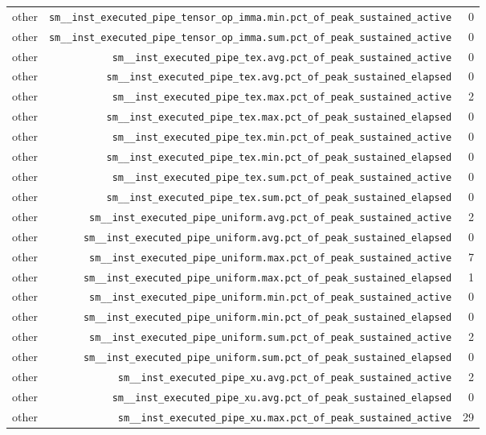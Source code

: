 \begin{table}[h]
\begin{tabular}{|l|r|r|}
other & \texttt{sm__inst_executed_pipe_tensor_op_imma.min.pct_of_peak_sustained_active} & 0 \\
other & \texttt{sm__inst_executed_pipe_tensor_op_imma.sum.pct_of_peak_sustained_active} & 0 \\
other & \texttt{sm__inst_executed_pipe_tex.avg.pct_of_peak_sustained_active} & 0 \\
other & \texttt{sm__inst_executed_pipe_tex.avg.pct_of_peak_sustained_elapsed} & 0 \\
other & \texttt{sm__inst_executed_pipe_tex.max.pct_of_peak_sustained_active} & 2 \\
other & \texttt{sm__inst_executed_pipe_tex.max.pct_of_peak_sustained_elapsed} & 0 \\
other & \texttt{sm__inst_executed_pipe_tex.min.pct_of_peak_sustained_active} & 0 \\
other & \texttt{sm__inst_executed_pipe_tex.min.pct_of_peak_sustained_elapsed} & 0 \\
other & \texttt{sm__inst_executed_pipe_tex.sum.pct_of_peak_sustained_active} & 0 \\
other & \texttt{sm__inst_executed_pipe_tex.sum.pct_of_peak_sustained_elapsed} & 0 \\
other & \texttt{sm__inst_executed_pipe_uniform.avg.pct_of_peak_sustained_active} & 2 \\
other & \texttt{sm__inst_executed_pipe_uniform.avg.pct_of_peak_sustained_elapsed} & 0 \\
other & \texttt{sm__inst_executed_pipe_uniform.max.pct_of_peak_sustained_active} & 7 \\
other & \texttt{sm__inst_executed_pipe_uniform.max.pct_of_peak_sustained_elapsed} & 1 \\
other & \texttt{sm__inst_executed_pipe_uniform.min.pct_of_peak_sustained_active} & 0 \\
other & \texttt{sm__inst_executed_pipe_uniform.min.pct_of_peak_sustained_elapsed} & 0 \\
other & \texttt{sm__inst_executed_pipe_uniform.sum.pct_of_peak_sustained_active} & 2 \\
other & \texttt{sm__inst_executed_pipe_uniform.sum.pct_of_peak_sustained_elapsed} & 0 \\
other & \texttt{sm__inst_executed_pipe_xu.avg.pct_of_peak_sustained_active} & 2 \\
other & \texttt{sm__inst_executed_pipe_xu.avg.pct_of_peak_sustained_elapsed} & 0 \\
other & \texttt{sm__inst_executed_pipe_xu.max.pct_of_peak_sustained_active} & 29 \\

\end{tabular}
\end{table}
